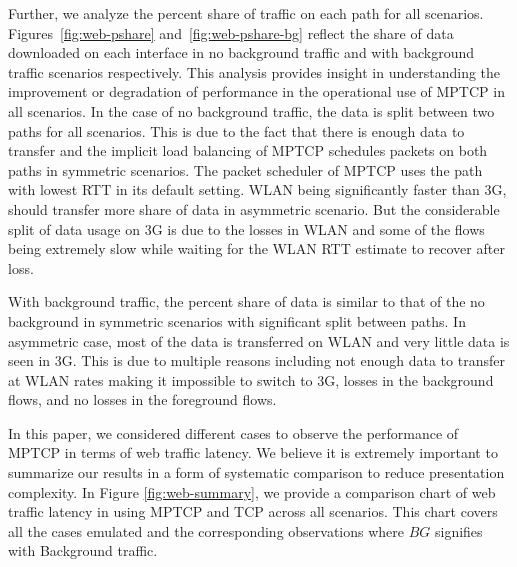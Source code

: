 Further, we analyze the percent share of traffic on each path for all scenarios. Figures~\ref{fig:web-pshare} and~\ref{fig:web-pshare-bg} reflect the 
share of data downloaded on each interface in no background traffic and with background traffic scenarios respectively. This analysis provides insight
in understanding the improvement or degradation of performance in the operational use of MPTCP in all scenarios. In the case of no background traffic,
the data is split between two paths for all scenarios. This is due to the fact that there is enough data to transfer and the implicit load balancing of MPTCP schedules
packets on both paths in symmetric scenarios. The packet scheduler of MPTCP uses the path with lowest RTT in its default setting. WLAN being significantly faster than 3G, should transfer more share 
of data in asymmetric scenario. But the considerable split of data usage on 3G is due to the losses in WLAN and some of the flows being extremely
slow while waiting for the WLAN RTT estimate to recover after loss.

With background traffic, the percent share of data is similar to that of the no background in symmetric scenarios with significant split between paths.
In asymmetric case, most of the data is transferred on WLAN and very little data is seen in 3G. This is due to multiple reasons including not enough data 
to transfer at WLAN rates making it impossible to switch to 3G, losses in the background flows, and no losses in the foreground flows.

In this paper, we considered different cases to observe the performance of MPTCP in terms of web traffic latency. We believe it is extremely important to
summarize our results in a form of systematic comparison to reduce presentation complexity. In Figure \ref{fig:web-summary}, we provide a comparison 
chart of web traffic latency in using MPTCP and TCP across all scenarios. This chart covers all the cases emulated and the corresponding observations where $BG$ 
signifies with Background traffic. 
